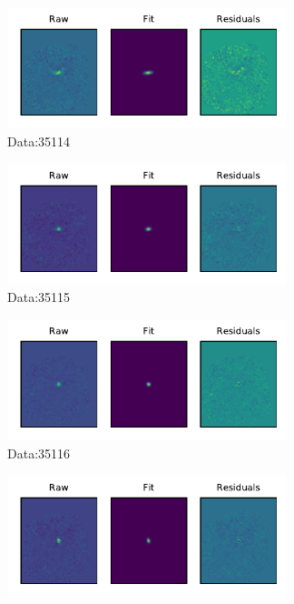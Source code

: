 \begin{figure}
    \centering
    \begin{subfigure}[b]{.49\textwidth}
        \centering
        \includegraphics[height=100pt]{CodeAndFigures/DataFits4.pdf}
        \caption{Data:35114}
        \label{fig:lmtFit4}
    \end{subfigure}
    \begin{subfigure}[b]{.49\textwidth}
        \centering
        \includegraphics[height=100pt]{CodeAndFigures/DataFits5.pdf}
        \caption{Data:35115}
        \label{fig:lmtFit5}
    \end{subfigure}
    \begin{subfigure}[b]{.49\textwidth}
        \centering
        \includegraphics[height=100pt]{CodeAndFigures/DataFits6.pdf}
        \caption{Data:35116}
        \label{fig:lmtFit6}
    \end{subfigure}
    \begin{subfigure}[b]{.49\textwidth}
        \centering
        \includegraphics[height=100pt]{CodeAndFigures/DataFits7.pdf}

\end{subfigure}
\end{figure}
